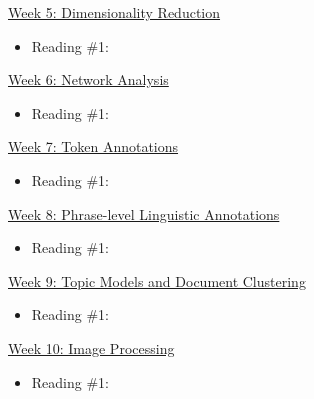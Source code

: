 \documentclass[12pt]{article}
\begin{document}
\vspace{12pt}

\underline{Week 5: Dimensionality Reduction}

\begin{itemize}[noitemsep,topsep=0pt,leftmargin=!,labelindent=5pt,itemindent=-70pt]
\item Reading \#1:
\end{itemize}

\vspace{12pt}

\underline{Week 6: Network Analysis}

\begin{itemize}[noitemsep,topsep=0pt,leftmargin=!,labelindent=5pt,itemindent=-70pt]
\item Reading \#1:
\end{itemize}

\vspace{12pt}

\underline{Week 7: Token Annotations}

\begin{itemize}[noitemsep,topsep=0pt,leftmargin=!,labelindent=5pt,itemindent=-70pt]
\item Reading \#1:
\end{itemize}

\vspace{12pt}

\underline{Week 8: Phrase-level Linguistic Annotations}

\begin{itemize}[noitemsep,topsep=0pt,leftmargin=!,labelindent=5pt,itemindent=-70pt]
\item Reading \#1:
\end{itemize}

\vspace{12pt}

\underline{Week 9: Topic Models and Document Clustering}

\begin{itemize}[noitemsep,topsep=0pt,leftmargin=!,labelindent=5pt,itemindent=-70pt]
\item Reading \#1:
\end{itemize}

\vspace{12pt}

\underline{Week 10: Image Processing}

\begin{itemize}[noitemsep,topsep=0pt,leftmargin=!,labelindent=5pt,itemindent=-70pt]
\item Reading \#1:
\end{itemize}

\vspace{12pt}
\end{document}
